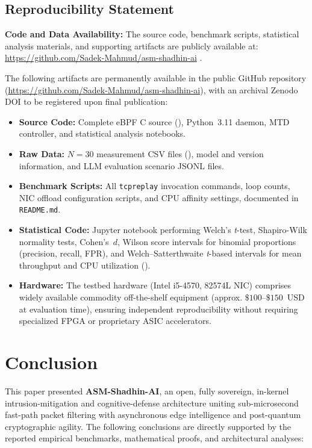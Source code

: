 \documentclass{ieeeaccess}
\renewcommand{\_}{\textunderscore\allowbreak}
\begin{document}
\subsection{Reproducibility Statement}
\textbf{Code and Data Availability:} The source code, benchmark scripts, statistical analysis materials, and supporting artifacts are publicly available at: \url{https://github.com/Sadek-Mahmud/asm-shadhin-ai} \cite{asmshadhinai2026code}.

The following artifacts are permanently available in the public GitHub repository
(\url{https://github.com/Sadek-Mahmud/asm-shadhin-ai}), with an archival Zenodo DOI
to be registered upon final publication:
\begin{itemize}
  \item \textbf{Source Code:} Complete eBPF C source (),
    Python~3.11 daemon, MTD controller, and statistical analysis notebooks.

  \item \textbf{Raw Data:} $N=30$ measurement CSV files
    (), model and version
    information, and LLM evaluation scenario JSONL files.

  \item \textbf{Benchmark Scripts:} All \texttt{tcpreplay} invocation commands,
    loop counts, NIC offload configuration scripts, and CPU affinity settings,
    documented in \texttt{README.md}.

  \item \textbf{Statistical Code:} Jupyter notebook performing Welch's
    \textit{t}-test, Shapiro-Wilk normality tests, Cohen's~$d$, Wilson score
    intervals for binomial proportions (precision, recall, FPR), and
    Welch--Satterthwaite \textit{t}-based intervals for mean throughput and CPU utilization
    ().

  \item \textbf{Hardware:} The testbed hardware (Intel i5-4570, 82574L NIC) comprises
    widely available commodity off-the-shelf equipment (approx. $\$100$--$\$150$~USD
    at evaluation time), ensuring independent reproducibility without requiring
    specialized FPGA or proprietary ASIC accelerators.
\end{itemize}

\section{Conclusion}
This paper presented \textbf{ASM-Shadhin-AI}, an open, fully sovereign,
in-kernel intrusion-mitigation and cognitive-defense architecture uniting
sub-microsecond fast-path packet filtering with asynchronous edge intelligence and
post-quantum cryptographic agility. The following conclusions are directly supported by
the reported empirical benchmarks, mathematical proofs, and architectural analyses:
\end{document}
